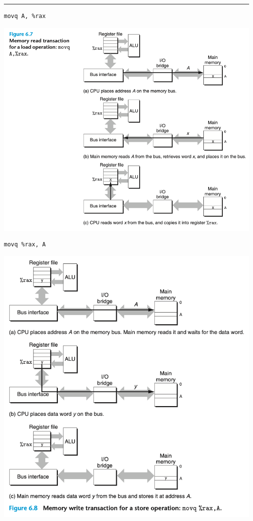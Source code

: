 \documentclass[11pt]{article}
\begin{document}
\begin{enumerate}
\noindent\rule{\textwidth}{0.5pt}

\begin{verbatim}
movq A, %rax
\end{verbatim}

\begin{center}
\includegraphics[width=.9\linewidth]{pics/figure6.7-memory-read-transaction.png}
\end{center}

\begin{verbatim}
movq %rax, A
\end{verbatim}

\begin{center}
\includegraphics[width=.9\linewidth]{pics/figure6.8-memory-write-transaction.png}
\end{center}
\end{enumerate}
\end{document}
